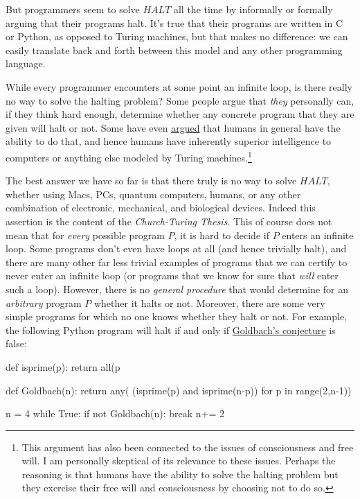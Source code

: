 But programmers seem to solve \(\ensuremath{\mathit{HALT}}\) all the
time by informally or formally arguing that their programs halt. It's
true that their programs are written in C or Python, as opposed to
Turing machines, but that makes no difference: we can easily translate
back and forth between this model and any other programming language.

While every programmer encounters at some point an infinite loop, is
there really no way to solve the halting problem? Some people argue that
\emph{they} personally can, if they think hard enough, determine whether
any concrete program that they are given will halt or not. Some have
even \href{https://goo.gl/Bm4MWK}{argued} that humans in general have
the ability to do that, and hence humans have inherently superior
intelligence to computers or anything else modeled by Turing
machines.\footnote{This argument has also been connected to the issues
  of consciousness and free will. I am personally skeptical of its
  relevance to these issues. Perhaps the reasoning is that humans have
  the ability to solve the halting problem but they exercise their free
  will and consciousness by choosing not to do so.}

The best answer we have so far is that there truly is no way to solve
\(\ensuremath{\mathit{HALT}}\), whether using Macs, PCs, quantum
computers, humans, or any other combination of electronic, mechanical,
and biological devices. Indeed this assertion is the content of the
\emph{Church-Turing Thesis}. This of course does not mean that for
\emph{every} possible program \(P\), it is hard to decide if \(P\)
enters an infinite loop. Some programs don't even have loops at all (and
hence trivially halt), and there are many other far less trivial
examples of programs that we can certify to never enter an infinite loop
(or programs that we know for sure that \emph{will} enter such a loop).
However, there is no \emph{general procedure} that would determine for
an \emph{arbitrary} program \(P\) whether it halts or not. Moreover,
there are some very simple programs for which no one knows whether they
halt or not. For example, the following Python program will halt if and
only if \href{https://goo.gl/DX63q5}{Goldbach's conjecture} is false:

\begin{code}
def isprime(p):
    return all(p %

def Goldbach(n):
    return any( (isprime(p) and isprime(n-p))
           for p in range(2,n-1))

n = 4
while True:
    if not Goldbach(n): break
    n+= 2
\end{code}

